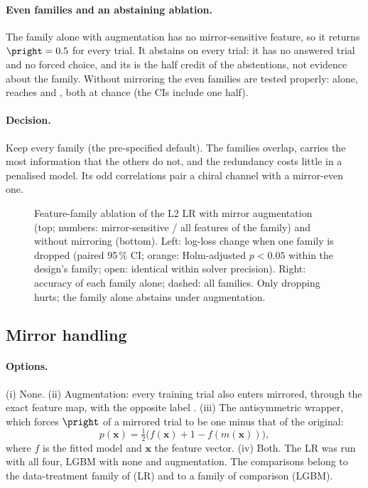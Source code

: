 \paragraph{Even families and an abstaining ablation.} The  family alone with augmentation has no
mirror-sensitive feature, so it returns $\pright = 0.5$ for every trial. It abstains on every trial: it has no
answered trial and no forced choice, and its  is the half credit of the
abstentions, not evidence about the family. Without mirroring the even families are tested properly: alone,
 reaches  and  ,
both at chance (the CIs include one half).

\paragraph{Decision.} Keep every family (the pre-specified default). The families overlap, 
carries the most information that the others do not, and the redundancy costs little in a penalised model. Its
odd correlations pair a chiral channel with a mirror-even one.

\begin{figure}[tbp]
\centering
{}
\caption{Feature-family ablation of the L2 LR with mirror augmentation (top; numbers: mirror-sensitive / all
features of the family) and without mirroring (bottom). Left: log-loss change when one family is dropped
(paired 95\,\% CI; orange: Holm-adjusted $p < 0.05$ within the design's family; open: identical within solver
precision). Right: accuracy of each family alone; dashed: all families. Only dropping  hurts; the
 family alone abstains under augmentation.}
\label{fig:M2_03_families}\label{fig:app:m2-families}
\end{figure}

\FloatBarrier
\subsection{Mirror handling}\label{app:m2:mirror}

\paragraph{Options.} (i) None. (ii) Augmentation: every training trial also enters mirrored, through the exact
feature map, with the opposite label \cite{um2017augmentation}. (iii) The antisymmetric wrapper, which forces
$\pright$ of a mirrored trial to be one minus that of the original:
\begin{equation}
  p(\mathbf{x}) = \tfrac{1}{2}\bigl(f(\mathbf{x}) + 1 - f(m(\mathbf{x}))\bigr),
  \label{eq:m2-antisym}
\end{equation}
where $f$ is the fitted model and $\mathbf{x}$ the feature vector. (iv) Both. The LR was run with all four,
LGBM with none and augmentation. The comparisons belong to the data-treatment family of
 (LR) and to a family of  comparison (LGBM).

